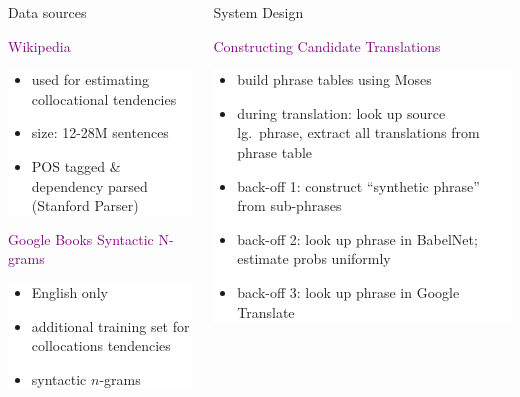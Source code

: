 \documentclass[final,t]{beamer}
\begin{document}
\begin{frame}{}
\begin{columns}[t]
\begin{column}{.4\linewidth}
\begin{block}{Data sources}
\begin{center}
\textcolor{purple}{Wikipedia}
\end{center}

\colorbox{white}{
\begin{minipage}{.85\linewidth}
\begin{itemize}
\item used for estimating collocational tendencies
\item size: 12-28M sentences
\item POS tagged \& dependency parsed (Stanford Parser)
\end{itemize}
\end{minipage}
}

\begin{center}
\textcolor{purple}{Google Books Syntactic N-grams}
\end{center}

\colorbox{white}{
\begin{minipage}{.85\linewidth}
\begin{itemize}
\item English only
\item additional training set for collocations tendencies
\item syntactic $n$-grams 

\end{itemize}
\end{minipage}
}

\end{block}

\end{column}

\begin{column}{.55\linewidth}


\begin{block}{System Design}

\begin{center}
  \textcolor{purple}{Constructing Candidate Translations}
 \end{center}

 \colorbox{white}{
\begin{minipage}{.90\linewidth}
 \begin{itemize}
  \item build phrase tables using Moses
  \item during translation: look up source lg.\ phrase, extract all translations from phrase table
  \item back-off 1: construct ``synthetic phrase'' from sub-phrases
  \item back-off 2: look up phrase in BabelNet; estimate probs uniformly
  \item back-off 3: look up phrase in Google Translate\\
  \end{itemize}
\end{minipage}
}
\vspace{1cm}



\end{block}
\end{column}
\end{columns}
\end{frame}
\end{document}
